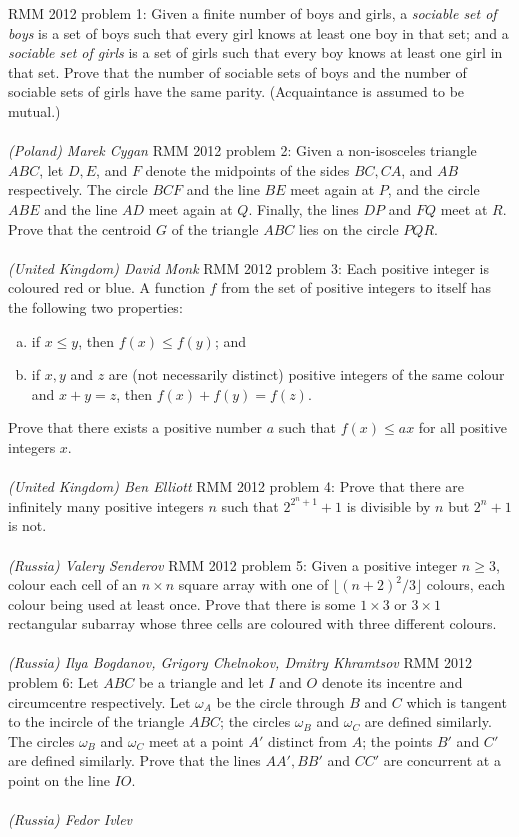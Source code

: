 RMM 2012 problem 1:  Given a finite number of boys and girls, a \textit{sociable set of boys} is a set of boys such that every girl knows at least one boy in that set; and a \textit{sociable set of girls} is a set of girls such that every boy knows at least one girl in that set. Prove that the number of sociable sets of boys and the number of sociable sets of girls have the same parity. (Acquaintance is assumed to be mutual.) \\\\
\textit{(Poland) Marek Cygan} 
RMM 2012 problem 2:  Given a non-isosceles triangle $ABC$, let $D,E$, and $F$ denote the midpoints of the sides $BC,CA$, and $AB$ respectively. The circle $BCF$ and the line $BE$ meet again at $P$, and the circle $ABE$ and the line $AD$ meet again at $Q$. Finally, the lines $DP$ and $FQ$ meet at $R$. Prove that the centroid $G$ of the triangle $ABC$ lies on the circle $PQR$. \\\\
\textit{(United Kingdom) David Monk} 
RMM 2012 problem 3:  Each positive integer is coloured red or blue. A function $f$ from the set of positive integers to itself has the following two properties:
\begin{enumerate}[(a)]
  \item if $x\le y$, then $f(x)\le f(y)$; and
  \item if $x,y$ and $z$ are (not necessarily distinct) positive integers of the same colour and $x+y=z$, then $f(x)+f(y)=f(z)$.
\end{enumerate}
Prove that there exists a positive number $a$ such that $f(x)\le ax$ for all positive integers $x$. \\\\
\textit{(United Kingdom) Ben Elliott} 
RMM 2012 problem 4:  Prove that there are infinitely many positive integers $n$ such that $2^{2^n+1}+1$ is divisible by $n$ but $2^n+1$ is not. \\\\
\textit{(Russia) Valery Senderov} 
RMM 2012 problem 5:  Given a positive integer $n\ge 3$, colour each cell of an $n\times n$ square array with one of $\lfloor (n+2)^2/3\rfloor$ colours, each colour being used at least once. Prove that there is some $1\times 3$ or $3\times 1$ rectangular subarray whose three cells are coloured with three different colours. \\\\
\textit{(Russia) Ilya Bogdanov, Grigory Chelnokov, Dmitry Khramtsov} 
RMM 2012 problem 6:  Let $ABC$ be a triangle and let $I$ and $O$ denote its incentre and circumcentre respectively. Let $\omega_A$ be the circle through $B$ and $C$ which is tangent to the incircle of the triangle $ABC$; the circles $\omega_B$ and $\omega_C$ are defined similarly. The circles $\omega_B$ and $\omega_C$ meet at a point $A'$ distinct from $A$; the points $B'$ and $C'$ are defined similarly. Prove that the lines $AA',BB'$ and $CC'$ are concurrent at a point on the line $IO$. \\\\
\textit{(Russia) Fedor Ivlev} 

